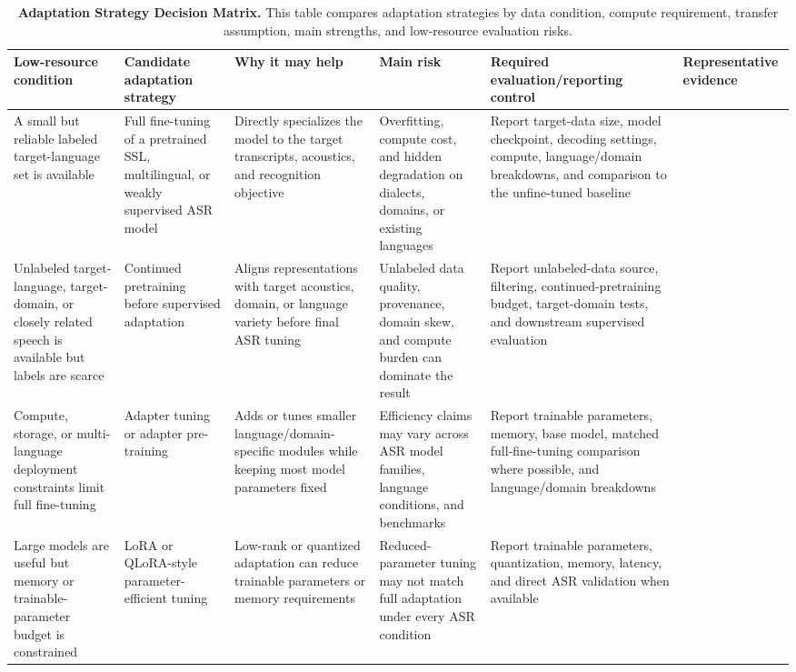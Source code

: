 \documentclass[pdflatex,sn-basic]{sn-jnl}
\theoremstyle{thmstyleone}
\theoremstyle{thmstyletwo}
\theoremstyle{thmstylethree}
\begin{document}
\begin{table}[htbp]
\setcounter{table}{2}
\footnotesize
\centering
\caption{\textbf{Adaptation Strategy Decision Matrix.} This table compares adaptation strategies by data condition, compute requirement, transfer assumption, main strengths, and low-resource evaluation risks.}
\label{tab:3}
\begin{tabularx}{\textwidth}{YYYYYY}
\toprule
\textbf{Low-resource condition} & \textbf{Candidate adaptation strategy} & \textbf{Why it may help} & \textbf{Main risk} & \textbf{Required evaluation/reporting control} & \textbf{Representative evidence} \\
\midrule
A small but reliable labeled target-language set is available & Full fine-tuning of a pretrained SSL, multilingual, or weakly supervised ASR model & Directly specializes the model to the target transcripts, acoustics, and recognition objective & Overfitting, compute cost, and hidden degradation on dialects, domains, or existing languages & Report target-data size, model checkpoint, decoding settings, compute, language/domain breakdowns, and comparison to the unfine-tuned baseline & \citep{babu22_interspeech,pmlr-v202-radford23a,pratap2024mms} \\
Unlabeled target-language, target-domain, or closely related speech is available but labels are scarce & Continued pretraining before supervised adaptation & Aligns representations with target acoustics, domain, or language variety before final ASR tuning & Unlabeled data quality, provenance, domain skew, and compute burden can dominate the result & Report unlabeled-data source, filtering, continued-pretraining budget, target-domain tests, and downstream supervised evaluation & \citep{getman24_interspeech,tian25b_interspeech} \\
Compute, storage, or multi-language deployment constraints limit full fine-tuning & Adapter tuning or adapter pre-training & Adds or tunes smaller language/domain-specific modules while keeping most model parameters fixed & Efficiency claims may vary across ASR model families, language conditions, and benchmarks & Report trainable parameters, memory, base model, matched full-fine-tuning comparison where possible, and language/domain breakdowns & \citep{pmlr-v97-houlsby19a,udupa24_interspeech} \\
Large models are useful but memory or trainable-parameter budget is constrained & LoRA or QLoRA-style parameter-efficient tuning & Low-rank or quantized adaptation can reduce trainable parameters or memory requirements & Reduced-parameter tuning may not match full adaptation under every ASR condition & Report trainable parameters, quantization, memory, latency, and direct ASR validation when available & \citep{hu2022lora,dettmers2023qlora} \\

\end{tabularx}
\end{table}
\end{document}

